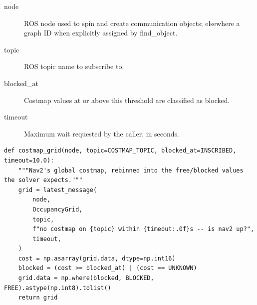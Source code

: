 \documentclass[11pt,a4paper]{book}
\begin{document}
\begin{description}
\item[node] ROS node used to spin and create communication objects; elsewhere a graph ID when explicitly assigned by find\_object.
\item[topic] ROS topic name to subscribe to.
\item[blocked\_at] Costmap values at or above this threshold are classified as blocked.
\item[timeout] Maximum wait requested by the caller, in seconds.
\end{description}

\begin{lstlisting}[firstnumber=115]
def costmap_grid(node, topic=COSTMAP_TOPIC, blocked_at=INSCRIBED, timeout=10.0):
    """Nav2's global costmap, rebinned into the free/blocked values the solver expects."""
    grid = latest_message(
        node,
        OccupancyGrid,
        topic,
        f"no costmap on {topic} within {timeout:.0f}s -- is nav2 up?",
        timeout,
    )
    cost = np.asarray(grid.data, dtype=np.int16)
    blocked = (cost >= blocked_at) | (cost == UNKNOWN)
    grid.data = np.where(blocked, BLOCKED, FREE).astype(np.int8).tolist()
    return grid


\end{lstlisting}
\end{document}
